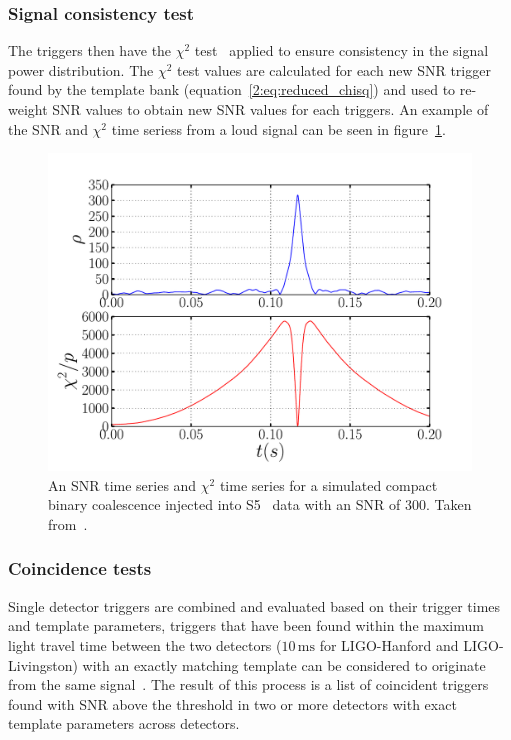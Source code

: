 \subsubsection{Signal consistency test}

The triggers then have the $\chi^{2}$ test~\cite{Allen_Chi:2005} applied to ensure consistency in the signal power distribution. The $\chi^{2}$ test values are calculated for each new SNR trigger found by the template bank (equation~\ref{2:eq:reduced_chisq}) and used to re-weight SNR values to obtain new SNR values for each triggers. An example of the SNR and $\chi^{2}$ time seriess from a loud signal can be seen in figure~\ref{2:fig:snr-timeseries}.
%
\begin{figure}
    \centering
    \includegraphics[width=0.75\linewidth]{images/2_searches/ihope_snr_timeseries.pdf}
    \caption{An SNR time series and $\chi^{2}$ time series for a simulated compact binary coalescence injected into S5~\cite{S5:2012} data with an SNR of $300$. Taken from~\cite{IHOPE:2012zx}.}
    \label{2:fig:snr-timeseries}
\end{figure}
%

\subsubsection{Coincidence tests}

Single detector triggers are combined and evaluated based on their trigger times and template parameters, triggers that have been found within the maximum light travel time between the two detectors ($10 \, \text{ms}$ for LIGO-Hanford and LIGO-Livingston) with an exactly matching template can be considered to originate from the same \gwadj signal~\cite{Robinson:2008}. The result of this process is a list of coincident triggers found with SNR above the threshold in two or more detectors with exact template parameters across detectors.

